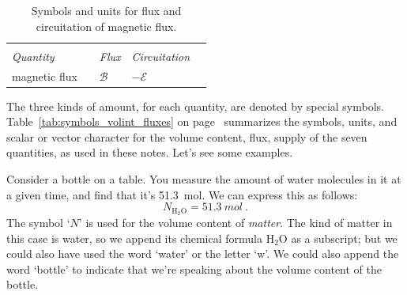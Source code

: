 \documentclass[a4paper,12pt,%
onecolumn,oneside,%
british%
]{memoir}
\renewcommand*{\|}[1][]{\nonscript\:#1\vert\nonscript\:\mathopen{}}
\newcommand*{\yN}{N}
\newcommand*{\yBf}{\mathcal{B}}
\newcommand*{\yEv}{\mathcal{E}}
\begin{document}
\begin{table}
  \vspace{10em}

  \begin{tabular*}{\linewidth}{@{\extracolsep{\fill}}lclll}
    \hline\\[-1ex]
    \textit{Quantity}&& \textit{Flux\enskip[unit]} & \textit{Circuitation\enskip[unit]} & %
    \\[4ex]
    magnetic flux&&$\yBf$\enskip[\unit{Wb}] &$-\yEv$ &
    \\[2ex]
    \hline
  \end{tabular*}
  \caption{Symbols and units for flux and circuitation of magnetic flux.}
  \label{tab:symbols_flux_circuit}
\end{table}


The three kinds of amount, for each quantity, are denoted by special symbols. Table~\ref{tab:symbols_volint_fluxes} on page~\pageref{tab:symbols_volint_fluxes} summarizes the symbols, units, and scalar or vector character for the volume content, flux, supply of the seven quantities, as used in these notes. Let's see some examples.

\medskip

%
%
Consider a bottle on a table. You measure the amount of water molecules in it at a given time, and find that it's \qty{51.3}{mol}. We can express this as follows:
\begin{equation*}
  \yN_{\mathrm{H_2O}} = \qty{51.3}{mol} \ .
\end{equation*}
The symbol \enquote*{$\yN$} is used for the volume content of \emph{matter}. The kind of matter in this case is water, so we append its chemical formula $\mathrm{H_2O}$ as a subscript; but we could also have used the word \enquote*{water} or the letter \enquote*{w}. We could also append the word \enquote*{bottle} to indicate that we're speaking about the volume content of the bottle.
\end{document}
